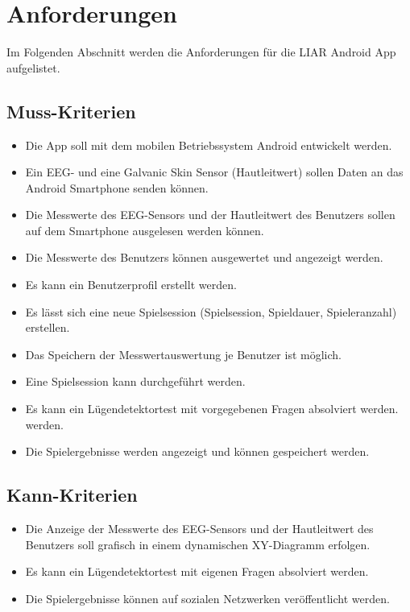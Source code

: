    	\section{Anforderungen}
   	Im Folgenden Abschnitt werden die Anforderungen für die LIAR Android App aufgelistet.
   	
   	\subsection{Muss-Kriterien}
	\begin{itemize}
	\item{}Die App soll mit dem mobilen Betriebssystem Android entwickelt werden.
	\item{}Ein EEG- und eine Galvanic Skin Sensor (Hautleitwert) sollen Daten an das Android Smartphone senden können.
	\item{}Die Messwerte des EEG-Sensors und der Hautleitwert des Benutzers sollen auf dem Smartphone ausgelesen werden können.
	\item{}Die Messwerte des Benutzers können ausgewertet und angezeigt werden.
	\item{}Es kann ein Benutzerprofil erstellt werden.
	\item{}Es lässt sich eine neue Spielsession (Spielsession, Spieldauer, Spieleranzahl) erstellen.
	\item{}Das Speichern der Messwertauswertung je Benutzer ist möglich.
	\item{}Eine Spielsession kann durchgeführt werden.
	\item{}Es kann ein Lügendetektortest mit vorgegebenen Fragen absolviert werden.
 werden.
	\item{}Die Spielergebnisse werden angezeigt und können gespeichert werden.
	\end{itemize}		
	
	\subsection{Kann-Kriterien}
	\begin{itemize}
		\item{}Die Anzeige der Messwerte des EEG-Sensors und der Hautleitwert des Benutzers soll grafisch in einem dynamischen XY-Diagramm erfolgen.
		\item{}Es kann ein Lügendetektortest mit eigenen Fragen absolviert werden.
		\item{}Die Spielergebnisse können auf sozialen Netzwerken veröffentlicht werden.	
	\end{itemize}

